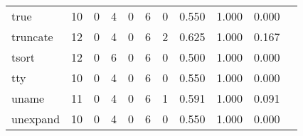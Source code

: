 \begin{longtable}{lp{1.2cm}p{1.2cm}p{1.2cm}p{1.2cm}p{1.2cm}p{1.2cm}p{1.2cm}p{1.2cm}p{1.2cm}p{1.2cm}}
true      &                                    10 &                                                  0 &                                                  4 &                                                  0 &                                                  6 &                                                  0 &                                         0.550 &                                              1.000 &                                              0.000 \\
truncate  &                                    12 &                                                  0 &                                                  4 &                                                  0 &                                                  6 &                                                  2 &                                         0.625 &                                              1.000 &                                              0.167 \\
tsort     &                                    12 &                                                  0 &                                                  6 &                                                  0 &                                                  6 &                                                  0 &                                         0.500 &                                              1.000 &                                              0.000 \\
tty       &                                    10 &                                                  0 &                                                  4 &                                                  0 &                                                  6 &                                                  0 &                                         0.550 &                                              1.000 &                                              0.000 \\
uname     &                                    11 &                                                  0 &                                                  4 &                                                  0 &                                                  6 &                                                  1 &                                         0.591 &                                              1.000 &                                              0.091 \\
unexpand  &                                    10 &                                                  0 &                                                  4 &                                                  0 &                                                  6 &                                                  0 &                                         0.550 &                                              1.000 &                                              0.000 \\

\end{longtable}
